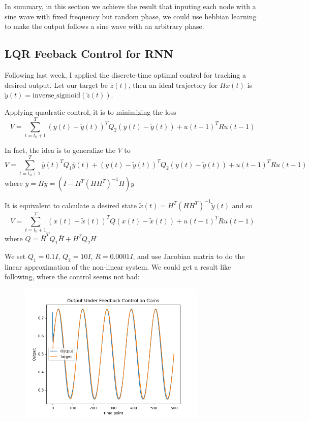 \documentclass[12pt, a4paper]{article}
\begin{document}
In summary, in this section we achieve the result that inputing each node with a sine wave with fixed frequency but random phase, we could use hebbian learning to make the output follows a sine wave with an arbitrary phase.

\newpage

\subsection*{LQR Feeback Control for RNN}

Following last week, I applied the discrete-time optimal control for tracking a desired output. Let our target be $\tilde{z}(t)$, then an ideal trajectory for $Hx(t)$ is $\tilde{y}(t) = \text{inverse\_sigmoid}(\tilde{z}(t))$. 

Applying quadratic control, it is to minimizing the loss $$V = \sum_{t=t_0+1}^T (y(t) - \tilde{y}(t))^T Q_2 (y(t)- \tilde{y}(t)) + u(t-1)^T R u(t-1)$$

In fact, the idea is to generalize the $V$ to $$V = \sum_{t=t_0+1}^T \bar{y}(t)^T Q_1 \bar{y}(t) + (y(t) - \tilde{y}(t))^T Q_2 (y(t)- \tilde{y}(t)) + u(t-1)^T R u(t-1)$$ where $\bar{y} = \bar{H}y = (I - H^T(HH^{T})^{-1}H)y$

It is equivalent to calculate a desired state $\tilde{x}(t) = H^T(HH^{T})^{-1}\tilde{y}(t)$ and so $$V = \sum_{t=t_0+1}^T (x(t) - \tilde{x}(t))^T Q (x(t)- \tilde{x}(t)) + u(t-1)^T R u(t-1)$$ where $Q=\bar{H}^T Q_1 \bar{H} + H^T Q_2 H$

We set $Q_1 = 0.1I$, $Q_2 = 10I$, $R=0.0001I$, and use Jacobian matrix to do the linear approximation of the non-linear system. We could get a result like following, where the control seems not bad:

\begin{figure}[H]
    \centering
    \includegraphics[width=0.8\textwidth]{RNN/FORCE/fig/FORCE_tracking_output_0412.png} \\
\end{figure}
\end{document}
